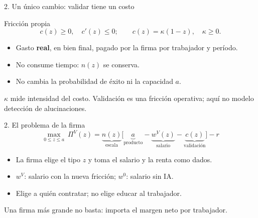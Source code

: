 \documentclass[aspectratio=169,11pt]{beamer}
\begin{document}
\begin{frame}{2. Un único cambio: validar tiene un costo}
\begin{block}{Fricción propia}
\[c(z)\geq0,\quad c'(z)\leq0;\qquad c(z)=\kappa(1-z),\quad\kappa\geq0.\]
\end{block}
\begin{itemize}
\item Gasto \textbf{real}, en bien final, pagado por la firma por trabajador y período.
\item No consume tiempo: $n(z)$ se conserva.
\item No cambia la probabilidad de éxito ni la capacidad $a$.
\end{itemize}
\begin{keybox}
$\kappa$ mide intensidad del costo. Validación es una fricción operativa; aquí no modelo detección de alucinaciones.
\end{keybox}
\end{frame}
\begin{frame}{2. El problema de la firma}
\[\max_{0\leq z\leq a}\ \Pi^V(z)=\underbrace{n(z)}_{\text{escala}}
\big[\underbrace{a}_{\text{producto}}-\underbrace{w^V(z)}_{\text{salario}}-\underbrace{c(z)}_{\text{validación}}\big]-r\]
\begin{itemize}
\item La firma elige el tipo $z$ y toma el salario y la renta como dados.
\item $w^V$: salario con la nueva fricción; $w^0$: salario sin IA.
\item Elige a quién contratar; no elige educar al trabajador.
\end{itemize}
\begin{keybox}
Una firma más grande no basta: importa el margen neto por trabajador.
\end{keybox}
\end{frame}
\end{document}
